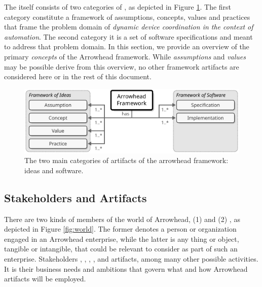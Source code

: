 %
%

The  itself consists of two categories of , as depicted in Figure \ref{fig:framework}.
The first category constitute a framework of assumptions, concepts, values and practices that frame the problem domain of \textit{dynamic device coordination in the context of automation}.
The second category it is a set of software specifications and  meant to address that problem domain.
In this section, we provide an overview of the primary \textit{concepts} of the Arrowhead framework.
While \textit{assumptions} and \textit{values} may be possible derive from this overview, no other framework artifacts are considered here or in the rest of this document.

\vspace*{1mm}

\begin{figure}[ht!]
  \centering
  \includegraphics[scale=0.9]{figures/framework}
  \caption{
    The two main categories of artifacts of the arrowhead framework: ideas and software.
  }
  \label{fig:framework}
\end{figure}

\vspace*{-3mm}

\subsection{Stakeholders and Artifacts}

There are two kinds of members of the world of Arrowhead, (1)  and (2) , as depicted in Figure \ref{fig:world}.
The former denotes a person or organization engaged in an Arrowhead enterprise, while the latter is any thing or object, tangible or intangible, that could be relevant to consider as part of such an enterprise.
Stakeholders , , , , and  artifacts, among many other possible activities.
It is their business needs and ambitions that govern what and how Arrowhead artifacts will be employed.


